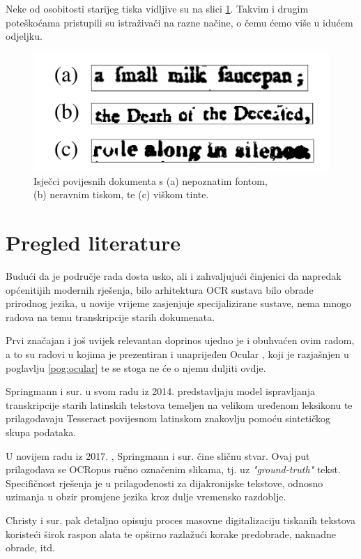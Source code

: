 \documentclass[zavrsnirad]{fer}
\begin{document}
Neke od osobitosti starijeg tiska vidljive su na slici \ref{slk:historical-issues}. Takvim i drugim poteškoćama pristupili su istraživači na razne načine, o čemu ćemo više u idućem odjeljku.

\begin{figure}[hbt]
	\centering
	\includegraphics[width=0.6\linewidth]{Figures/historical-issues.png} 
	\caption{Isječci povijesnih dokumenta s (a) nepoznatim fontom, \\ (b) neravnim tiskom, te (c) viškom tinte. \cite{Berg2013}}
	\label{slk:historical-issues}
\end{figure}

\section{Pregled literature}

Budući da je područje rada dosta usko, ali i zahvaljujući činjenici da napredak općenitijih modernih rješenja, bilo arhitektura OCR sustava bilo obrade prirodnog jezika, u novije vrijeme zasjenjuje specijalizirane sustave, nema mnogo radova na temu transkripcije starih dokumenata.

Prvi značajan i još uvijek relevantan doprinos ujedno je i obuhvaćen ovim radom, a to su radovi u kojima je prezentiran \cite{Berg2013} i unaprijeđen Ocular \cite{Berg2014, Garrette2015, Garrette2016}, koji je razjašnjen u poglavlju \ref{pog:ocular} te se stoga ne će o njemu duljiti ovdje.

Springmann i sur. u svom radu iz 2014. \cite{Springmann2014} predstavljaju model ispravljanja transkripcije starih latinskih tekstova temeljen na velikom uređenom leksikonu te prilagođavaju Tesseract povijesnom latinskom znakovlju pomoću sintetičkog skupa podataka.

U novijem radu iz 2017. \cite{Springmann2017}, Springmann i sur. čine sličnu stvar. Ovaj put prilagođava se OCRopus ručno označenim slikama, tj. uz \textit{"ground-truth"} tekst. Specifičnost rješenja je u prilagođenosti za dijakronijske tekstove, odnosno  uzimanja u obzir promjene jezika kroz dulje vremensko razdoblje.

Christy i sur. \cite{Christy2017} pak detaljno opisuju proces masovne digitalizaciju tiskanih tekstova koristeći širok raspon alata te opširno razlažući korake predobrade, naknadne obrade, itd.
\end{document}
